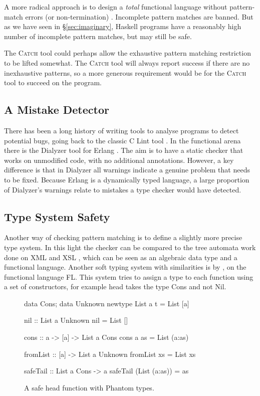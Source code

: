 \documentclass[preprint]{sigplanconf}
\newcommand{\C}[1]{\textsf{#1}}
\newcommand{\catch}{\textsc{Catch}}
\newenvironment{discuss}
    {\noindent\hspace{-1.5mm}\vline\hspace{1mm}\vline\hspace{1mm}\begin{minipage}[h]{\linewidth}}
    {\end{minipage}}
\begin{document}
A more radical approach is to design a \textit{total} functional language without pattern-match errors (or non-termination) \citep{turner:total}. Incomplete pattern matches are banned. But as we have seen in \S\ref{sec:imaginary}, Haskell programs have a reasonably high number of incomplete pattern matches, but may still be safe.

The \catch{} tool could perhaps allow the exhaustive pattern matching restriction to be lifted somewhat. The \catch{} tool will always report success if there are no inexhaustive patterns, so a more generous requirement would be for the \catch{} tool to succeed on the program.

\subsection{A Mistake Detector}

There has been a long history of writing tools to analyse programs to detect potential bugs, going back to the classic C Lint tool \citep{lint}. In the functional arena there is the Dialyzer tool \citep{dialyzer} for Erlang \citep{erlang}. The aim is to have a static checker that works on unmodified code, with no additional annotations. However, a key difference is that in Dialyzer all warnings indicate a genuine problem that needs to be fixed. Because Erlang is a dynamically typed language, a large proportion of Dialyzer's warnings relate to mistakes a type checker would have detected.

\subsection{Type System Safety}

\begin{discuss}
Another way of checking pattern matching is to define a slightly more precise type system. In this light the checker can be compared to the tree automata work done on XML and XSL \citep{static_xslt}, which can be seen as an algebraic data type and a functional language. Another soft typing system with similarities is by \citet{aiken:type_infer}, on the functional language FL. This system tries to assign a type to each function using a set of constructors, for example \C{head} takes the type \C{Cons} and not \C{Nil}.
\end{discuss}

\begin{figure}
\begin{code}
data Cons; data Unknown
newtype List a t = List [a]

nil :: List a Unknown
nil = List []

cons :: a -> [a] -> List a Cons
cons a as = List (a:as)

fromList :: [a] -> List a Unknown
fromList xs = List xs

safeTail :: List a Cons -> a
safeTail (List (a:as)) = as
\end{code}
\caption{A safe \C{head} function with Phantom types.}
\label{fig:phantom}
\end{figure}
\end{document}
